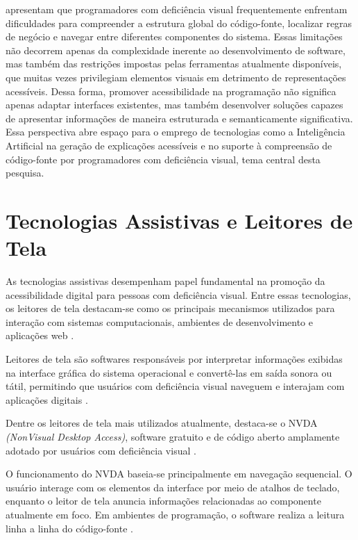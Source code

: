 \documentclass[
    12pt,                   %
    openright,              %
    oneside,                %
    a4paper,                %
    sumario=tradicional,    %
    english,                %
    brazil,                 %
    ]{abntex2}
\begin{document}
\textcite{acad54431201,latinoware20457} apresentam que programadores com deficiência visual frequentemente enfrentam dificuldades para compreender a estrutura global do código-fonte, localizar regras de negócio e navegar entre diferentes componentes do sistema. Essas limitações não decorrem apenas da complexidade inerente ao desenvolvimento de software, mas também das restrições impostas pelas ferramentas atualmente disponíveis, que muitas vezes privilegiam elementos visuais em detrimento de representações acessíveis. Dessa forma, promover acessibilidade na programação não significa apenas adaptar interfaces existentes, mas também desenvolver soluções capazes de apresentar informações de maneira estruturada e semanticamente significativa. Essa perspectiva abre espaço para o emprego de tecnologias como a Inteligência Artificial na geração de explicações acessíveis e no suporte à compreensão de código-fonte por programadores com deficiência visual, tema central desta pesquisa.

\section{Tecnologias Assistivas e Leitores de Tela}\label{sec:TrabRel}
  As tecnologias assistivas desempenham papel fundamental na promoção da acessibilidade digital para pessoas com deficiência visual. Entre essas tecnologias, os leitores de tela destacam-se como os principais mecanismos utilizados para interação com sistemas computacionais, ambientes de desenvolvimento e aplicações web \cite{latinoware20457}. 
  
  Leitores de tela são softwares responsáveis por interpretar informações exibidas na interface gráfica do sistema operacional e convertê-las em saída sonora ou tátil, permitindo que usuários com deficiência visual naveguem e interajam com aplicações digitais \cite{latinoware37693}. 
  
  Dentre os leitores de tela mais utilizados atualmente, destaca-se o NVDA \textit{(NonVisual Desktop Access)}, software gratuito e de código aberto amplamente adotado por usuários com deficiência visual \cite{latinoware20457}. 
  
  O funcionamento do NVDA baseia-se principalmente em navegação sequencial. O usuário interage com os elementos da interface por meio de atalhos de teclado, enquanto o leitor de tela anuncia informações relacionadas ao componente atualmente em foco. Em ambientes de programação, o software realiza a leitura linha a linha do código-fonte \cite{latinoware20457}. 
  
\end{document}
